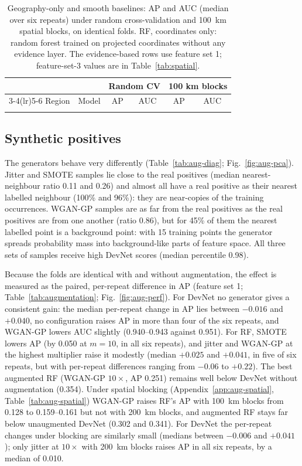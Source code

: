 \documentclass[pdflatex,sn-apa]{sn-jnl}
\begin{document}
\begin{table}[t]
\caption{Geography-only and smooth baselines: AP and AUC (median over six repeats) under random cross-validation and 100~km spatial blocks, on identical folds. RF, coordinates only: random forest trained on projected coordinates without any evidence layer. The evidence-based rows use feature set 1; feature-set-3 values are in Table~\ref{tab:spatial}.}\label{tab:geography}
\footnotesize
\setlength{\tabcolsep}{3pt}
\begin{tabular*}{\textwidth}{@{\extracolsep\fill}llcccc}
\toprule
 & & \multicolumn{2}{c}{Random CV} & \multicolumn{2}{c}{100 km blocks} \\
\cmidrule(lr){3-4}\cmidrule(lr){5-6}
Region & Model & AP & AUC & AP & AUC \\
\midrule
\botrule
\end{tabular*}
\end{table}

\subsection{Synthetic positives}\label{sec:res-augmentation}

The generators behave very differently (Table~\ref{tab:aug-diag}; Fig.~\ref{fig:aug-pca}). Jitter and SMOTE samples lie close to the real positives (median nearest-neighbour ratio 0.11 and 0.26) and almost all have a real positive as their nearest labelled neighbour (100\% and 96\%): they are near-copies of the training occurrences. WGAN-GP samples are as far from the real positives as the real positives are from one another (ratio 0.86), but for 45\% of them the nearest labelled point is a background point: with 15 training points the generator spreads probability mass into background-like parts of feature space. All three sets of samples receive high DevNet scores (median percentile 0.98).

Because the folds are identical with and without augmentation, the effect is measured as the paired, per-repeat difference in AP (feature set 1; Table~\ref{tab:augmentation}; Fig.~\ref{fig:aug-perf}). For DevNet no generator gives a consistent gain: the median per-repeat change in AP lies between $-0.016$ and $+0.040$, no configuration raises AP in more than four of the six repeats, and WGAN-GP lowers AUC slightly (0.940--0.943 against 0.951). For RF, SMOTE lowers AP (by 0.050 at $m = 10$, in all six repeats), and jitter and WGAN-GP at the highest multiplier raise it modestly (median $+0.025$ and $+0.041$, in five of six repeats, but with per-repeat differences ranging from $-0.06$ to $+0.22$). The best augmented RF (WGAN-GP $10\times$, AP 0.251) remains well below DevNet without augmentation (0.354). Under spatial blocking (Appendix~\ref{app:aug-spatial}, Table~\ref{tab:aug-spatial}) WGAN-GP raises RF's AP with 100~km blocks from 0.128 to 0.159--0.161 but not with 200~km blocks, and augmented RF stays far below unaugmented DevNet (0.302 and 0.341). For DevNet the per-repeat changes under blocking are similarly small (medians between $-0.006$ and $+0.041$); only jitter at $10\times$ with 200~km blocks raises AP in all six repeats, by a median of 0.010.
\end{document}
